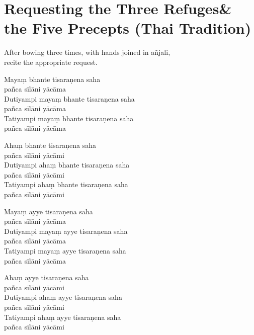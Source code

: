 \section[Three Refuges \& the Five Precepts]{Requesting the Three Refuges\newline \& the Five Precepts (Thai Tradition)}

\label{three-refuges}

\begin{instruction}
  After bowing three times, with hands joined in añjali,\\
  recite the appropriate request.
\end{instruction}

\ifhandbookedition
\enlargethispage{\baselineskip}
\fi


Mayaṃ bhante tisaraṇena saha\\\vin pañca sīlāni yācāma\\
Dutiyampi mayaṃ bhante tisaraṇena saha\\\vin pañca sīlāni yācāma\\
Tatiyampi mayaṃ bhante tisaraṇena saha\\\vin pañca sīlāni yācāma


Ahaṃ bhante tisaraṇena saha\\\vin pañca sīlāni yācāmi\\
Dutiyampi ahaṃ bhante tisaraṇena saha\\\vin pañca sīlāni yācāmi\\
Tatiyampi ahaṃ bhante tisaraṇena saha\\\vin pañca sīlāni yācāmi


Mayaṃ ayye tisaraṇena saha\\\vin pañca sīlāni yācāma\\
Dutiyampi mayaṃ ayye tisaraṇena saha\\\vin pañca sīlāni yācāma\\
Tatiyampi mayaṃ ayye tisaraṇena saha\\\vin pañca sīlāni yācāma


Ahaṃ ayye tisaraṇena saha\\\vin pañca sīlāni yācāmi\\
Dutiyampi ahaṃ ayye tisaraṇena saha\\\vin pañca sīlāni yācāmi\\
Tatiyampi ahaṃ ayye tisaraṇena saha\\\vin pañca sīlāni yācāmi

